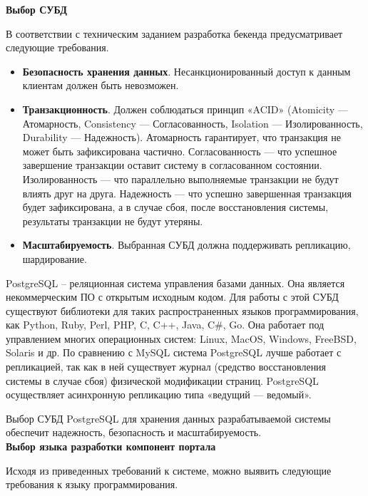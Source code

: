 \textbf{Выбор СУБД}

В  соответствии  с  техническим  заданием  разработка  бекенда предусматривает следующие требования.
\begin{itemize}
	\item \textbf{Безопасность  хранения  данных}.  Несанкционированный  доступ к данным клиентам должен быть невозможен.
	
	\item \textbf{Транзакционность}.  Должен  соблюдаться  принцип  «ACID» (Atomicity  —  Атомарность,  Consistency  —  Согласованность, Isolation — Изолированность, Durability — Надежность). Атомарность гарантирует, что транзакция не может быть зафиксирована частично.  Согласованность  —  что  успешное  завершение  транзакции оставит  систему  в  согласованном состоянии. Изолированность  —  что  параллельно  выполняемые  транзакции  не  будут влиять друг на друга. Надежность — что успешно завершенная транзакция  будет  зафиксирована,  а  в случае  сбоя, после восстановления системы, результаты транзакции не будут утеряны.
	
	\item \textbf{Масштабируемость}.  Выбранная  СУБД  должна  поддерживать репликацию, шардирование.
\end{itemize}

PostgreSQL \cite{bib:postgresql} -- реляционная  система  управления  базами данных. Она является  некоммерческим ПО с открытым исходным кодом. Для работы с этой СУБД существуют библиотеки для таких распространенных  языков  программирования,  как  Python,  Ruby, Perl, PHP, C, C++, Java, C\#, Go. Она работает под управлением многих операционных систем: Linux, MacOS, Windows, FreeBSD, Solaris и  др. По сравнению с MySQL система PostgreSQL лучше работает с репликацией, так как в ней существует журнал (средство восстановления системы  в случае  сбоя) физической модификации страниц. PostgreSQL осуществляет асинхронную репликацию типа «ведущий — ведомый».

Выбор  СУБД  PostgreSQL  для  хранения  данных разрабатываемой системы обеспечит надежность, безопасность и масштабируемость. \\

\textbf{Выбор языка разработки компонент портала}

Исходя из приведенных требований к системе, можно выявить следующие требования к языку программирования.

